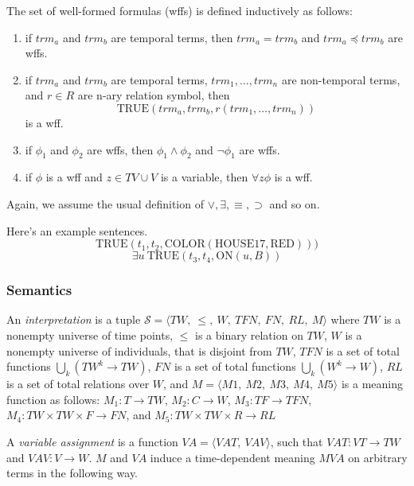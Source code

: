 The set of well-formed formulas (wffs) is defined inductively as follows:
\begin{enumerate}
	\item if $trm_a$ and $trm_b$ are temporal terms, then $trm_a = trm_b$ and $trm_a \preceq trm_b$ are wffs.
	\item if $trm_a$ and $trm_b$ are temporal terms, $trm_1, \dots, trm_n$ are non-temporal terms, and $r \in R$ are n-ary relation symbol,
	      then
	      \[
		      \text{TRUE}(trm_a, trm_b, r(trm_1, \dots, trm_n))
	      \]
	      is a wff.
	\item if $\phi_1$ and $\phi_2$ are wffs, then $\phi_1 \land \phi_2$ and $\neg \phi_1$ are wffs.
	\item if $\phi$ is a wff and $z \in TV \cup V$ is a variable, then $\forall z \phi$ is a wff.
\end{enumerate}

Again, we assume the usual definition of $\lor, \exists, \equiv, \supset$ and so on.

\begin{exmp} Here's an example sentences.
	\begin{equation}
		\text{TRUE}(t_1, t_2, \text{COLOR}(\text{HOUSE17}, \text{RED})))
	\end{equation}
	\begin{equation}
		\exists u \ \text{TRUE}(t_3, t_4, \text{ON}(u,B))
	\end{equation}
\end{exmp}

\subsubsection{Semantics}
An \textit{interpretation} is a tuple $\mathscr{S} = \langle  TW,\ \leqslant,\ W,\ TFN,\ FN,\ RL,\ M\rangle$ where $TW$
is a nonempty universe of time points, $\leqslant$ is a binary relation on $TW$, $W$ is a nonempty universe of individuals,
that is disjoint from $TW$, $TFN$ is a set of total functions $\bigcup_k (TW^k \rightarrow TW)$,
$FN$ is a set of total functions $ \bigcup_k (W^k \rightarrow W)$, $RL$ is a set of total relations over $W$, and
$M = \langle M1,\ M2,\ M3,\ M4,\ M5 \rangle$ is a meaning function as follows: $M_1 : T \rightarrow TW$,
$M_2: C \to W$, $M_3 : TF \to TFN$, $M_4 : TW \times TW \times F \to FN$, and $M_5: TW \times TW \times R \to RL$

A \textit{variable assignment} is a function $ VA = \langle VAT,\ VAV \rangle$, such that $VAT: VT \to TW$ and
$VAV: V \to W$. $M$ and $VA$ induce a time-dependent meaning $MVA$ on arbitrary terms in the following way.


